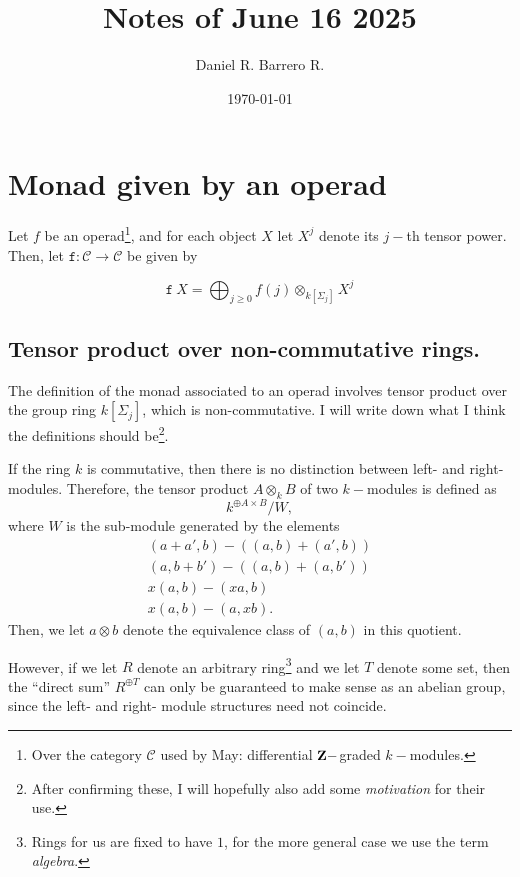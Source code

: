 \documentclass{amsart}
\title{Notes of June 16 2025}
\author{Daniel R. Barrero R.}
\date{\today}
\begin{document}
\maketitle

\section{Monad given by an operad}

Let $f$ be an operad\footnote{Over the category $\mathcal{C}$ used by May: differential
$\mathbf{Z}-$graded $k-$modules.}, and for each object $X$ let $X^j$ denote its $j-$th tensor
power. Then, let $\mathtt{f} : \mathcal{C} \to \mathcal{C}$ be given by

$$
\mathtt{f}\ X = \bigoplus_{j \geq 0} f(j) \otimes_{k[\Sigma_j]} X^j
$$

\subsection{Tensor product over non-commutative rings.} The definition of the monad associated to
an operad involves tensor product over the group ring $k[\Sigma_j]$, which is non-commutative.
I will write down what I think the definitions should be\footnote{After confirming these, I will
hopefully also add some \emph{motivation} for their use.}.

\begin{defn}
	If the ring $k$ is commutative, then there is no distinction between left- and right-
	modules. Therefore, the tensor product $A \otimes_k B$ of two $k-$modules is defined as
	$$
	k^{\oplus A \times B}/W,
	$$
	where $W$ is the sub-module generated by the elements
	\begin{eqnarray*}
		(a+a', b) - \left( (a, b) + (a', b) \right) \\
		(a, b+b') - \left( (a, b) + (a, b') \right) \\
		x(a, b) - (xa, b) \\
		x(a, b) - (a, xb).
	\end{eqnarray*}
	Then, we let $a \otimes b$ denote the equivalence class of $(a, b)$ in this quotient.
\end{defn}

However, if we let $R$ denote an arbitrary ring\footnote{Rings for us are fixed to have $1$, for
the more general case we use the term \emph{algebra}.} and we let $T$ denote some set, then the
``direct sum'' $R^{\oplus T}$ can only be guaranteed to make sense as an abelian group, since the
left- and right- module structures need not coincide.
\end{document}
